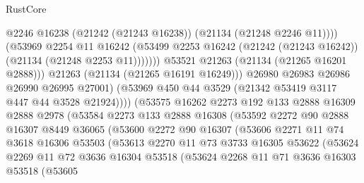 \begin{lexlean}{RustCore}
\begin{coremodule}
                                  @2246
                                  @16238
                                  (@21242 (@21243 @16238))
                                  (@21134 (@21248 @2246 @11))))
                              (@53969
                                @2254
                                @11
                                @16242
                                (@53499
                                  @2253
                                  @16242
                                  (@21242 (@21243 @16242))
                                  (@21134 (@21248 @2253 @11)))))))
                        @53521
                        @21263
                        (@21134 (@21265 @16201 @2888)))
                      @21263
                      (@21134 (@21265 @16191 @16249)))
                    @26980
                    @26983
                    @26986
                    @26990
                    @26995
                    @27001)
                  (@53969 @450 @44 @3529 (@21342 @53419 @3117 @447 @44 @3528 @21924))))
              (@53575
                @16262
                @2273
                @192
                @133
                @2888
                @16309
                @2888
                @2978
                (@53584
                  @2273
                  @133
                  @2888
                  @16308
                  (@53592
                    @2272
                    @90
                    @2888
                    @16307
                    @8449
                    @36065
                    (@53600
                      @2272
                      @90
                      @16307
                      (@53606
                        @2271
                        @11
                        @74
                        @3618
                        @16306
                        @53503
                        (@53613
                          @2270
                          @11
                          @73
                          @3733
                          @16305
                          @53622
                          (@53624
                            @2269
                            @11
                            @72
                            @3636
                            @16304
                            @53518
                            (@53624
                              @2268
                              @11
                              @71
                              @3636
                              @16303
                              @53518
                              (@53605

\end{coremodule}
\end{lexlean}
